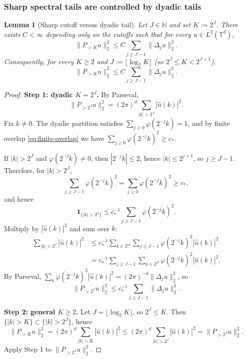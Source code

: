 \documentclass{article}
\numberwithin{equation}{section}
\theoremstyle{plain}
\newtheorem{lemma}[theorem]{Lemma}
\theoremstyle{definition}
\theoremstyle{remark}
\newcommand{\N}{\mathbb{N}}
\newcommand{\T}{\mathbb{T}}
\newcommand{\Z}{\mathbb{Z}}
\begin{document}
\subsubsection{Sharp spectral tails are controlled by dyadic tails}

\begin{lemma}[Sharp cutoff versus dyadic tail]
\label{lem:sharp-vs-dyadic}
Let $J\in\N$ and set $K:=2^J$.
There exists $C<\infty$ depending only on the cutoffs such that for every $u\in L^2(\T^d)$,
\[
\|P_{>K}u\|_2^2 \le C\sum_{j\ge J-1}\|\Delta_j u\|_2^2.
\]
Consequently, for every $K\ge 2$ and $J:=\lfloor \log_2 K\rfloor$ (so $2^J\le K<2^{J+1}$),
\[
\|P_{>K}u\|_2^2 \le C\sum_{j\ge J-1}\|\Delta_j u\|_2^2.
\]
\end{lemma}

\begin{proof}
\textbf{Step 1: dyadic $K=2^J$.}
By Parseval,
\[
\|P_{>2^J}u\|_2^2=(2\pi)^d\sum_{|k|>2^J}|\widehat u(k)|^2.
\]
Fix $k\neq 0$. The dyadic partition satisfies $\sum_{j\ge 0}\varphi(2^{-j}k)=1$, and by finite overlap
\eqref{eq:finite-overlap} we have $\sum_{j\ge 0}\varphi(2^{-j}k)^2\ge c_*$.

If $|k|>2^J$ and $\varphi(2^{-j}k)\neq 0$, then $|2^{-j}k|\le 2$, hence $|k|\le 2^{j+1}$, so $j\ge J-1$.
Therefore, for $|k|>2^J$,
\[
\sum_{j\ge J-1}\varphi(2^{-j}k)^2=\sum_{j\ge 0}\varphi(2^{-j}k)^2\ge c_*,
\]
and hence
\[
\mathbf 1_{\{|k|>2^J\}} \le c_*^{-1}\sum_{j\ge J-1}\varphi(2^{-j}k)^2.
\]
Multiply by $|\widehat u(k)|^2$ and sum over $k$:
\begin{align*}
\sum_{|k|>2^J}|\widehat u(k)|^2
&\le c_*^{-1}\sum_{k\in\Z^d}\sum_{j\ge J-1}\varphi(2^{-j}k)^2|\widehat u(k)|^2 \\
&= c_*^{-1}\sum_{j\ge J-1}\sum_{k\in\Z^d}\varphi(2^{-j}k)^2|\widehat u(k)|^2.
\end{align*}
By Parseval, $\sum_{k}\varphi(2^{-j}k)^2|\widehat u(k)|^2=(2\pi)^{-d}\|\Delta_j u\|_2^2$, so
\[
\|P_{>2^J}u\|_2^2 \le c_*^{-1}\sum_{j\ge J-1}\|\Delta_j u\|_2^2.
\]

\textbf{Step 2: general $K\ge 2$.}
Let $J=\lfloor\log_2 K\rfloor$, so $2^J\le K$. Then $\{|k|>K\}\subset\{|k|>2^J\}$, hence
\[
\|P_{>K}u\|_2^2=(2\pi)^d\sum_{|k|>K}|\widehat u(k)|^2
\le (2\pi)^d\sum_{|k|>2^J}|\widehat u(k)|^2
=\|P_{>2^J}u\|_2^2.
\]
Apply Step 1 to $\|P_{>2^J}u\|_2^2$.
\end{proof}


\end{document}
